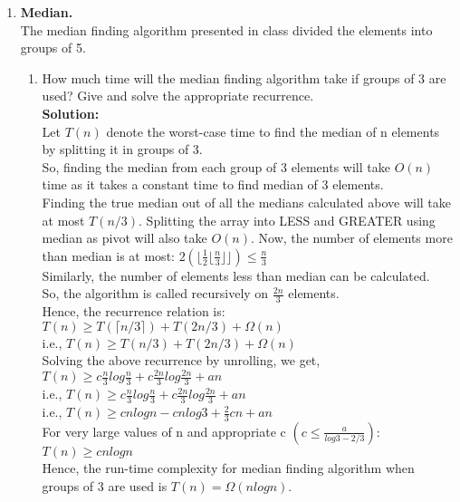 \documentclass[12pt]{article}
\begin{document}
\begin{enumerate}
\begin{enumerate}
\begin{enumerate}
\end{enumerate}
\end{enumerate}
\pagebreak
\item \textbf{Median.}\\
The median finding algorithm presented in class divided the elements into groups of 5.
\begin{enumerate}
\item How much time will the median finding algorithm take if groups of 3 are used? Give and solve the appropriate recurrence.\\
\textbf{Solution:}\\
 Let $T(n)$ denote the worst-case time to find the median of n elements by splitting it in groups of 3.\\
 So, finding the median from each group of 3 elements will take $O(n)$ time as it takes a constant time to find median of 3 elements.\\
 Finding the true median out of all the medians calculated above will take at most $T(n/3)$.
 Splitting the array into LESS and GREATER using median as pivot will also take $O(n)$.
 Now, the number of elements more than median is at most:
 $\displaystyle{2(\lfloor\frac{1}{2}\lfloor \frac{n}{3}\rfloor\rfloor) \leq \frac{n}{3}} $\\
 Similarly, the number of elements less than median can be calculated.\\
 So, the algorithm is called recursively on $\displaystyle{\frac{2n}{3}}$ elements.\\
 Hence, the recurrence relation is:\\
  $T(n) \geq T(\lceil n/3\rceil) + T(2n/3) + \Omega(n)$\\
 i.e., $T(n) \geq T(n/3) + T(2n/3) + \Omega(n)$\\
 Solving the above recurrence by unrolling, we get,\\
 $\displaystyle{T (n) \geq c\frac{n}{3} log \frac{n}{3} + c\frac{2n}{3} log \frac{2n}{3} + an}$\\
 i.e., $\displaystyle{T (n) \geq c\frac{n}{3} log \frac{n}{3} + c\frac{2n}{3} log \frac{2n}{3} + an}$\\
 i.e., $\displaystyle{T(n) \geq c n log n - c n log 3+ \frac{2}{3}cn+an}$\\
 For very large values of n and appropriate c $\displaystyle{(c \leq \frac{a}{log 3 - 2/3})}$:\\ 
 $\displaystyle{T(n) \geq c n log n}$\\
 Hence, the run-time complexity for median finding algorithm when groups of 3 are used is $\displaystyle{T(n) = \Omega(n log n)}$.\\


\end{enumerate}
\end{enumerate}
\end{document}
